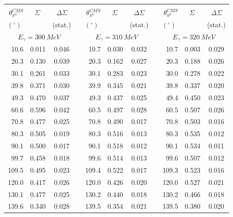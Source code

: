 \begin{table}[htbp] 
\begin{center} 
\begin{tabular}{|r|r|c|l|r|r|c|l|r|r|c|} 

\cline{1-3} 
\cline{5-7} 
\cline{9-11} 
& & & & & & & & & &\\ 
$\theta_{\pi^0}^{CMS}$ & 
$\Sigma\;\;\;$ & 
${\Delta}\Sigma$ & & 
$\theta_{\pi^0}^{CMS}$ & 
$\Sigma\;\;\;$ & 
${\Delta}\Sigma$ & & 
$\theta_{\pi^0}^{CMS}$ & 
$\Sigma\;\;\;$ & 
${\Delta}\Sigma$ \\ 
 $(^{\circ})\;$ & &(stat.) & & $(^{\circ})\;$ & &(stat.) & & $(^{\circ})\;$ & &(stat.) \\ 
\cline{1-3} 
\cline{5-7} 
\cline{9-11} 
\multicolumn{3}{|c|}{ $E_{\gamma}=300~MeV$} & & 
\multicolumn{3}{c|}{ $E_{\gamma}=310~MeV$} & & 
\multicolumn{3}{c|}{ $E_{\gamma}=320~MeV$} \\ 
\cline{1-3} 
\cline{5-7} 
\cline{9-11} 
 10.6 & 0.011 & 0.046 & &  10.7 & 0.030 & 0.032 & &  10.7 & 0.003 & 0.029 \\ 
 20.3 & 0.130 & 0.039 & &  20.3 & 0.162 & 0.027 & &  20.3 & 0.188 & 0.026 \\ 
 30.1 & 0.261 & 0.033 & &  30.1 & 0.283 & 0.023 & &  30.0 & 0.278 & 0.022 \\ 
 39.8 & 0.371 & 0.030 & &  39.9 & 0.345 & 0.021 & &  39.8 & 0.337 & 0.020 \\ 
 49.3 & 0.470 & 0.037 & &  49.3 & 0.437 & 0.025 & &  49.4 & 0.450 & 0.023 \\ 
 60.6 & 0.596 & 0.042 & &  60.5 & 0.497 & 0.028 & &  60.5 & 0.507 & 0.026 \\ 
 70.8 & 0.477 & 0.025 & &  70.8 & 0.490 & 0.017 & &  70.8 & 0.503 & 0.016 \\ 
 80.3 & 0.505 & 0.019 & &  80.3 & 0.516 & 0.013 & &  80.3 & 0.535 & 0.012 \\ 
 90.1 & 0.500 & 0.017 & &  90.1 & 0.518 & 0.012 & &  90.1 & 0.534 & 0.011 \\ 
 99.7 & 0.458 & 0.018 & &  99.6 & 0.514 & 0.013 & &  99.6 & 0.507 & 0.012 \\ 
109.5 & 0.495 & 0.023 & & 109.4 & 0.522 & 0.017 & & 109.3 & 0.523 & 0.016 \\ 
120.0 & 0.417 & 0.026 & & 120.0 & 0.426 & 0.020 & & 120.0 & 0.527 & 0.021 \\ 
130.1 & 0.477 & 0.025 & & 130.2 & 0.440 & 0.018 & & 130.2 & 0.466 & 0.018 \\ 
139.6 & 0.340 & 0.028 & & 139.5 & 0.354 & 0.021 & & 139.5 & 0.380 & 0.020 \\ 

\end{tabular}
\end{center}
\end{table}
